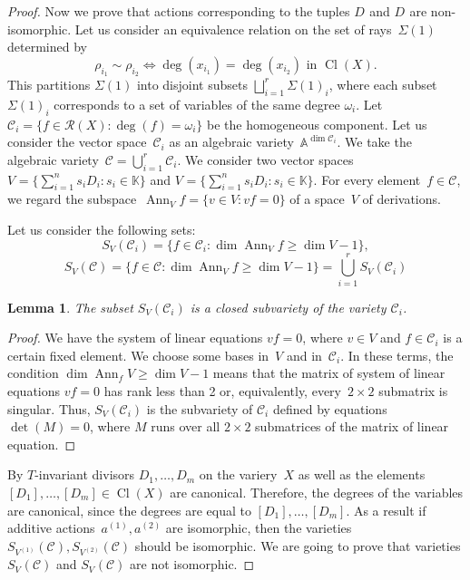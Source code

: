 \documentclass[a4paper,reqno,12pt]{amsart}
\DeclareMathOperator {\dimm}{dim}
\DeclareMathOperator {\Cl}{Cl}
\DeclareMathOperator {\Ann}{Ann}
\DeclareMathOperator {\NNA}{(2)}
\DeclareMathOperator {\NA}{(1)}
\def\A  {\mathbb A}
\def\K  {\mathbb K}
\newtheorem{lmm}{Lemma}
\theoremstyle{definition}
\begin{document}
\begin{proof}
      \smallskip
      
  Now we prove that actions corresponding to the tuples $D^{\NA}$ and $D^{\NNA}$ are non-isomorphic.
  Let us consider an equivalence relation on the set of rays~$\Sigma(1)$ determined by
    \[\rho_{i_1} \sim \rho_{i_2} \Longleftrightarrow \deg(x_{i_1}) = \deg(x_{i_2}) \text{ in } \Cl(X).\]
    This partitions $\Sigma(1)$ into disjoint subsets $\bigsqcup\limits_{i=1}^r\Sigma(1)_{i}$, where each subset $\Sigma(1)_i$ corresponds to a set of variables of the same degree $\omega_i$.
    Let $\mathcal{C}_i = \{f \in \mathcal R(X) : \deg(f) = \omega_i\}$ be the homogeneous component.
    Let us consider the vector space~$\mathcal{C}_i$ as an algebraic variety~$\A^{\dimm \mathcal{C}_i}$.
    We take the algebraic variety~$\mathcal{C} = \bigcup\limits_{i=1}^r \mathcal{C}_i$.
  We consider two vector spaces~${V^{\NA} = \{\sum\limits_{i=1}^n s_i D^{\NA}_i : s_i \in \K\}}$ and ${V^{\NNA} = \{\sum\limits_{i=1}^n s_i D^{\NNA}_i: s_i \in \K\}}$.
  For every element~${f \in \mathcal{C}}$, we regard the subspace~${\Ann_V f =\{v \in V:vf=0 \}}$
  of a space~$V$ of derivations.
  
  Let us consider the following sets:
  \[S_V(\mathcal{C}_i) = \{f\in \mathcal{C}_i : \dimm \Ann_V f \geq  \dimm V-1\},\]
  \[S_V(\mathcal{C}) = \{f\in \mathcal{C} : \dimm \Ann_V f \geq \dimm V-1\} = \bigcup\limits_{i=1}^r S_V(\mathcal{C}_i)\]
    \begin{lmm}
    The subset $S_V(\mathcal{C}_i)$ is a closed subvariety of the variety $\mathcal{C}_i$.
  \end{lmm}
  \begin{proof}
    We have the system of linear equations $vf = 0$, where $v \in V$ and $f \in \mathcal{C}_i$ is a certain fixed element.
    We  choose some bases  in~$V$ and in~$\mathcal{C}_i$.
    In these terms, the condition $\dim \Ann_f V \geq \dim V - 1$ means that the matrix of system of linear equations $vf = 0$ has rank less than 2 or, equivalently, every~$2\times 2$ submatrix is singular.
    Thus, $S_V(\mathcal{C}_i)$ is the subvariety of $\mathcal{C}_i$ defined by  equations~${\det(M)=0}$, where $M$ runs over all $2\times 2$ submatrices of the matrix of linear equation.
  \end{proof}
    By \cite[Theorem~3.2.6]{CLS} $T$-invariant divisors $D_1, \ldots, D_m$ on the variery~$X$ as well as the elements~$[D_1], \ldots, [D_m]\in \Cl(X)$ are canonical.
  Therefore, the degrees of the variables are canonical, since the degrees are equal to $[D_1], \ldots, [D_m]$.
  As a result if additive actions~${a^{(1)}, a^{(2)}}$ are isomorphic,
  then the varieties~${S_{V^{(1)}}(\mathcal{C}), S_{V^{(2)}}(\mathcal{C})}$ should be isomorphic.
  We are going to prove that varieties $S_{V^{\NA}}(\mathcal{C})$ and $S_{V^{\NNA}}(\mathcal{C})$ are not isomorphic.



\end{proof}
\end{document}
